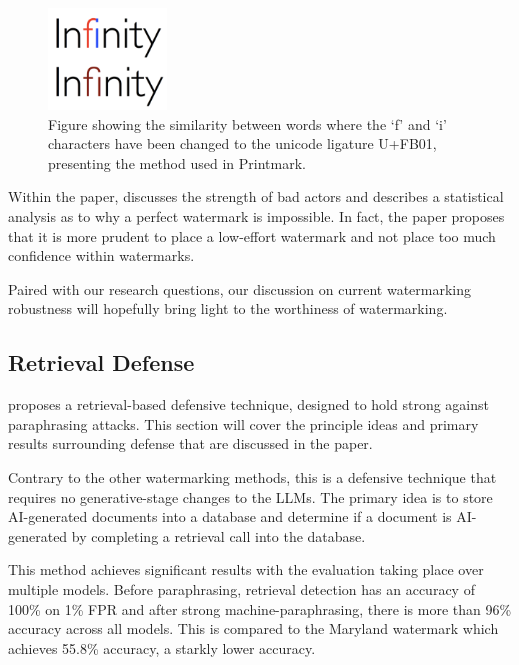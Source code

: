 \documentclass{l4proj}
\theoremstyle{definition}
\begin{document}
        \begin{figure}[h]
            \centering
            \includegraphics[width=1\linewidth, height=2.7cm, keepaspectratio]{images/background/inf-ligature.png}
            \caption{Figure showing the similarity between words where the `f' and `i' characters have been changed to the unicode ligature U+FB01, presenting the method used in Printmark.}
            \label{fig:fi-ligature}
            \nocite{infinity-ligatures-pict}
        \end{figure}

        Within the paper, \citet{sato2023embarrassingly} discusses the strength of bad actors and describes a statistical analysis as to why a perfect watermark is impossible. In fact, the paper proposes that it is more prudent to place a low-effort watermark and not place too much confidence within watermarks. 

        Paired with our research questions, our discussion on current watermarking robustness will hopefully bring light to the worthiness of watermarking.
    
    \subsection{Retrieval Defense}
        \citet{krishna2023paraphrasing} proposes a retrieval-based defensive technique, designed to hold strong against paraphrasing attacks. This section will cover the principle ideas and primary results surrounding defense that are discussed in the paper. 

        Contrary to the other watermarking methods, this is a defensive technique that requires no generative-stage changes to the LLMs. The primary idea is to store AI-generated documents into a database and determine if a document is AI-generated by completing a retrieval call into the database.

        This method achieves significant results with the evaluation taking place over multiple models. Before paraphrasing, retrieval detection has an accuracy of 100\% on 1\% FPR and after strong machine-paraphrasing, there is more than 96\% accuracy across all models. This is compared to the Maryland watermark which achieves 55.8\% accuracy, a starkly lower accuracy.
        
\end{document}
